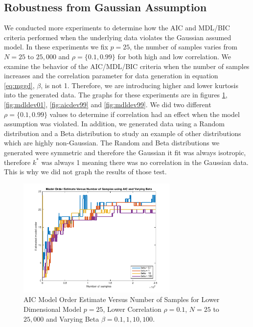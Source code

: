 \documentclass[journal]{IEEEtran}
\begin{document}
\subsection{Robustness from Gaussian Assumption}
\par We conducted more experiments to determine how the AIC and MDL/BIC criteria performed when the underlying data violates the Gaussian assumed model. In these experiments we fix \(p = 25\), the number of samples varies from \(N = 25\) to \(25,000\) and \(\rho = \{0.1, 0.99\}\) for both high and low correlation. We examine the behavior of the AIC/MDL/BIC criteria when the number of samples increases and the correlation parameter for data generation in equation \ref{eq:mggd}, \(\beta\), is not 1. Therefore, we are introducing higher and lower kurtosis into the generated data. The graphs for these experiments are in figures \ref{fig:aicdev01}, \ref{fig:mdldev01}, \ref{fig:aicdev99} and \ref{fig:mdldev99}. We did two different \(\rho = \{0.1, 0.99\}\) values to determine if correlation had an effect when the model assumption was violated. In addition, we generated data using a Random distribution and a Beta distribution to study an example of other distributions which are highly non-Gaussian. The Random and Beta distributions we generated were symmetric and therefore the Gaussian it fit was always isotropic, therefore \(k^*\) was always 1 meaning there was no correlation in the Gaussian data. This is why we did not graph the results of those test.

\begin{figure}[h]
\centering
\includegraphics[width=3.1in]{../images/deviation_aic_01.png}
\caption{AIC Model Order Estimate Versus Number of Samples for Lower Dimensional Model \(p = 25\), Lower Correlation \(\rho = 0.1\), \(N = 25\) to \(25,000\) and Varying Beta \(\beta = {0.1, 1, 10, 100}\).}
\label{fig:aicdev01}
\end{figure}
\end{document}

